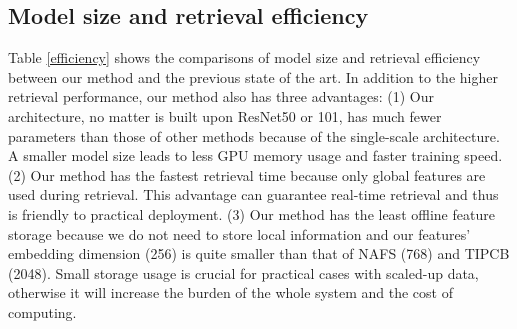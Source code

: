 \documentclass{bmvc2k}
\begin{document}
\vspace*{-2mm}
\subsection{Model size and retrieval efficiency}
Table \ref{efficiency} shows the comparisons of model size and retrieval efficiency between our method and the previous state of the art. In addition to the higher retrieval performance, our method also has three advantages: (1) Our architecture, no matter is built upon ResNet50 or 101, has much fewer parameters than those of other methods because of the single-scale architecture. A smaller model size leads to less GPU memory usage and faster training speed. (2) Our method has the fastest retrieval time because only global features are used during retrieval. This advantage can guarantee real-time retrieval and thus is friendly to practical deployment. (3) Our method has the least offline feature storage because we do not need to store local information and our features' embedding dimension (256) is quite smaller than that of NAFS (768) and TIPCB (2048). Small storage usage is crucial for practical cases with scaled-up data, otherwise it will increase the burden of the whole system and the cost of computing.
\end{document}
